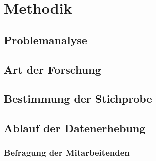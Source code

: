 
\chapter{Methodik}
\label{ch:methodik}

\section{Problemanalyse}


\section{Art der Forschung}

\section{Bestimmung der Stichprobe}

\section{Ablauf der Datenerhebung}

\subsection{Befragung der Mitarbeitenden}

